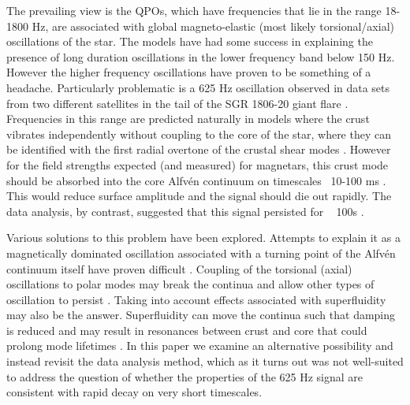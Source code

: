 \documentclass{emulateapj}
\begin{document}
The prevailing view is the QPOs, which have frequencies that lie in the range 18-1800 Hz, are associated with global magneto-elastic (most likely torsional/axial) oscillations of the star. The models have had some success in explaining the presence of long duration oscillations in the lower frequency band below 150 Hz. However the higher frequency oscillations have proven to be something of a headache. Particularly problematic is a 625 Hz oscillation observed in data sets from two different satellites in the tail of the SGR 1806-20 giant flare \citep{Watts06, Strohmayer06}.  Frequencies in this range are predicted naturally in models where the crust vibrates independently without coupling to the core of the star, where they can be identified with the first radial overtone of the crustal shear modes \citep{Piro05}.  However for the field strengths expected (and measured) for magnetars, this crust mode should be absorbed into the core Alfv\'en continuum on timescales ~10-100 ms \citep{vanHoven12, Gabler12}. This would reduce surface amplitude and the signal should die out rapidly. The data analysis, by contrast, suggested that this signal persisted for ~ 100s \citep{Strohmayer06}.

Various solutions to this problem have been explored. Attempts to explain it as a magnetically dominated oscillation associated with a turning point of the Alfv\'en continuum itself have proven difficult \citep{vanHoven11, vanHoven12}. Coupling of the torsional (axial) oscillations to polar modes may break the continua and allow other types of oscillation to persist \citep{Lander10, Lander11, Colaiuda12}. Taking into account effects associated with superfluidity may also be the answer. Superfluidity can move the continua such that damping is reduced \citep{vanHoven08, Andersson09, Passamonti13a} and may result in resonances between crust and core that could prolong mode lifetimes \citep{Gabler13, Passamonti13b}.  In this paper we examine an alternative possibility and instead revisit the data analysis method, which as it turns out was not well-suited to address the question of whether the properties of the 625 Hz signal are consistent with rapid decay on very short timescales.
\end{document}
